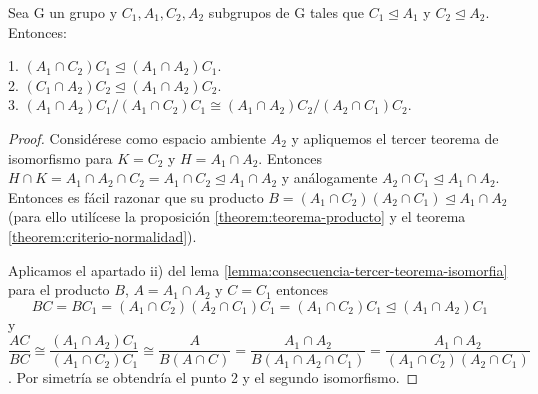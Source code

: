 \begin{nprop}
Sea G un grupo y $C_1,A_1,C_2,A_2$ subgrupos de G tales que $C_1 \trianglelefteq A_1$ y $C_2 \trianglelefteq A_2$. Entonces:

1. $(A_1 \cap C_2)C_1 \trianglelefteq (A_1 \cap A_2)C_1$.\\
2. $(C_1 \cap A_2)C_2 \trianglelefteq (A_1 \cap A_2)C_2$.\\
3. $(A_1 \cap A_2)C_1/(A_1 \cap C_2)C_1 \cong (A_1 \cap A_2)C_2/(A_2 \cap C_1)C_2$.
\end{nprop}
\begin{proof}
Considérese como espacio ambiente $A_2$ y apliquemos el tercer teorema de isomorfismo para $K = C_2$ y $H = A_1 \cap A_2$. Entonces $H \cap K = A_1 \cap A_2 \cap C_2 = A_1 \cap C_2 \trianglelefteq A_1 \cap A_2$ y análogamente $A_2 \cap C_1 \trianglelefteq A_1 \cap A_2$. Entonces es fácil razonar que su producto $B = (A_1 \cap C_2)(A_2 \cap C_1) \trianglelefteq A_1 \cap A_2$ (para ello utilícese la proposición \ref{theorem:teorema-producto} y el teorema \ref{theorem:criterio-normalidad}). 

Aplicamos el apartado ii) del lema \ref{lemma:consecuencia-tercer-teorema-isomorfia} para el producto $B$, $A = A_1 \cap A_2$ y $C = C_1$ entonces $$BC = BC_1 = (A_1 \cap C_2)(A_2 \cap C_1)C_1 = (A_1 \cap C_2)C_1 \trianglelefteq (A_1 \cap A_2)C_1$$ y $$\frac{AC}{BC} \cong \frac{(A_1 \cap A_2)C_1}{(A_1 \cap C_2)C_1} \cong \frac{A}{B(A \cap C)} = \frac{A_1 \cap A_2}{B(A_1 \cap A_2 \cap C_1)} = \frac{A_1 \cap A_2}{(A_1 \cap C_2)(A_2 \cap C_1)}$$. Por simetría se obtendría el punto 2 y el segundo isomorfismo.
\end{proof}

